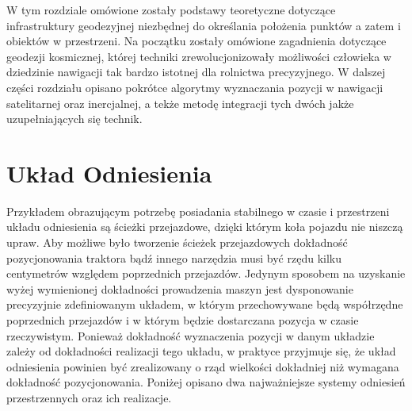 
W tym rozdziale omówione zostały podstawy teoretyczne dotyczące infrastruktury geodezyjnej niezbędnej do określania 
położenia punktów a zatem i obiektów w przestrzeni. Na początku zostały omówione zagadnienia dotyczące geodezji kosmicznej,
której techniki zrewolucjonizowały możliwości człowieka w dziedzinie nawigacji tak bardzo istotnej dla rolnictwa precyzyjnego.
W dalszej części rozdziału opisano pokrótce algorytmy wyznaczania pozycji w nawigacji satelitarnej oraz inercjalnej, a tekże metodę 
integracji tych dwóch jakże uzupełniających się technik. 

\section{Układ Odniesienia}
Przykładem obrazującym potrzebę posiadania stabilnego w czasie i przestrzeni układu odniesienia są ścieżki przejazdowe,
dzięki którym koła pojazdu nie niszczą upraw. Aby możliwe było tworzenie ścieżek przejazdowych dokładność pozycjonowania 
traktora bądź innego narzędzia musi być rzędu kilku centymetrów względem poprzednich przejazdów. Jedynym sposobem 
na uzyskanie wyżej wymienionej dokładności prowadzenia maszyn jest dysponowanie precyzyjnie zdefiniowanym 
układem, w którym przechowywane będą współrzędne poprzednich przejazdów i w którym będzie dostarczana pozycja w 
czasie rzeczywistym. Ponieważ dokładność wyznaczenia pozycji w danym układzie zależy od dokładności realizacji tego układu,
w praktyce przyjmuje się, że układ odniesienia powinien być zrealizowany o rząd wielkości dokładniej niż wymagana dokładność pozycjonowania. \cite[][strona 210]{ggos}
Poniżej opisano dwa najważniejsze systemy odniesień przestrzennych oraz ich realizacje.
